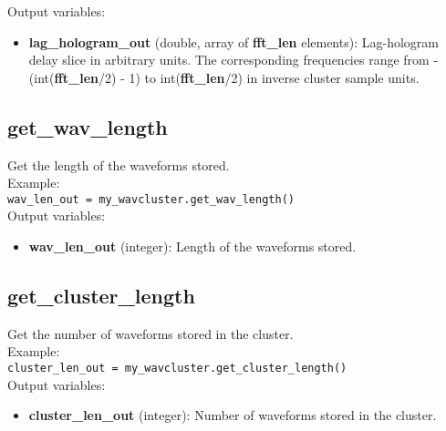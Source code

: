 Output variables:
\begin{itemize}
\item {\bf lag\_hologram\_out} (double, array of {\bf fft\_len} elements): Lag-hologram delay slice in arbitrary units. The corresponding frequencies range from -(int({\bf fft\_len}/2) - 1) to int({\bf fft\_len}/2) in inverse cluster sample units.
\end{itemize}


\subsection{get\_wav\_length}

Get the length of the waveforms stored.\\

Example:\\

\texttt{wav\_len\_out = my\_wavcluster.get\_wav\_length()}\\

Output variables:
\begin{itemize}
\item {\bf wav\_len\_out} (integer): Length of the waveforms stored.
\end{itemize}


\subsection{get\_cluster\_length}

Get the number of waveforms stored in the cluster.\\

Example:\\

\texttt{cluster\_len\_out = my\_wavcluster.get\_cluster\_length()}\\

Output variables:
\begin{itemize}
\item {\bf cluster\_len\_out} (integer): Number of waveforms stored in the cluster.
\end{itemize}

